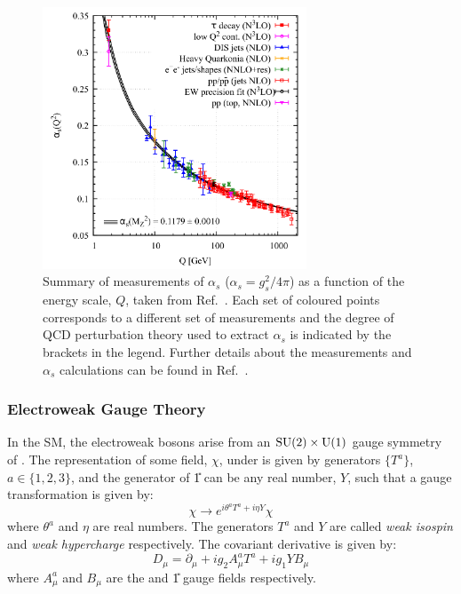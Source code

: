 \begin{figure}
  \centering
  \includegraphics[width=0.7\textwidth]{Figures/Theory/SM/alphas_running.pdf}
  \caption[Measurements of $\alpha_s$ as a Function of Energy Scale]{Summary of measurements of $\alpha_s$ ($\alpha_s = g_s^2 / 4\pi$) as a function of the energy scale, $Q$, taken from Ref.~\cite{ParticleDataGroup:2020ssz}. Each set of coloured points corresponds to a different set of measurements and the degree of QCD perturbation theory used to extract $\alpha_s$ is indicated by the brackets in the legend. Further details about the measurements and $\alpha_s$ calculations can be found in Ref.~\cite{ParticleDataGroup:2020ssz}.}\label{fig:alphas_running}
\end{figure}

\subsubsection{Electroweak Gauge Theory}
In the SM, the electroweak bosons arise from an $\mathrm{SU}(2) \times \mathrm{U}(1)$ gauge symmetry of \LSM. The representation of some field, $\chi$, under  is given by generators $\{T^a\}$, $a \in \{1,2,3\}$, and the generator of \U{1} can be any real number, $Y$, such that a gauge transformation is given by:
\begin{equation}
  \chi \to e^{i\theta^a T^a + i\eta Y} \chi
\end{equation}
where $\theta^a$ and $\eta$ are real numbers. The generators $T^a$ and $Y$ are called \textit{weak isospin} and \textit{weak hypercharge} respectively. The covariant derivative is given by:
\begin{equation}
  D_\mu = \partial_\mu + i g_2 A^a_\mu T^a + i g_1 Y B_\mu
  \label{eq:electroweak_covariant}
\end{equation}
where $A^a_\mu$ and $B_\mu$ are the  and \U{1} gauge fields respectively. 

